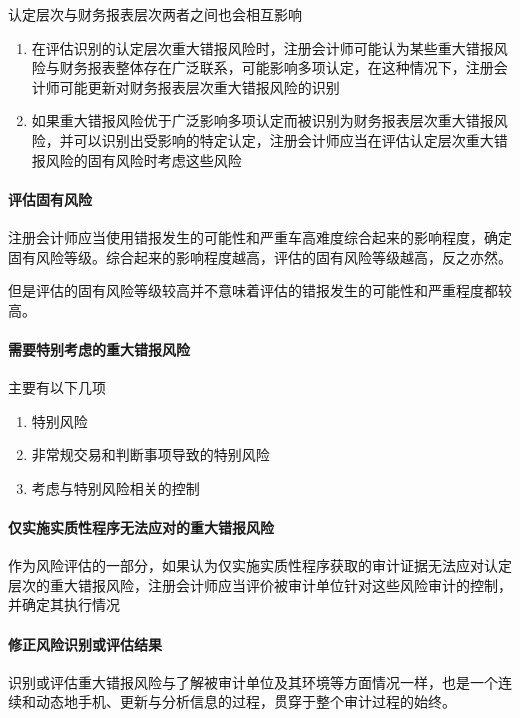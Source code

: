 \documentclass[UTF8,12pt]{ctexart}
\numberwithin{equation}{section} %
\numberwithin{figure}{section}
\numberwithin{table}{section}
\begin{document}
	认定层次与财务报表层次两者之间也会相互影响
	\begin{enumerate}
		\item 在评估识别的认定层次重大错报风险时，注册会计师可能认为某些重大错报风险与财务报表整体存在广泛联系，可能影响多项认定，在这种情况下，注册会计师可能更新对财务报表层次重大错报风险的识别
		
		\item 如果重大错报风险优于广泛影响多项认定而被识别为财务报表层次重大错报风险，并可以识别出受影响的特定认定，注册会计师应当在评估认定层次重大错报风险的固有风险时考虑这些风险
	\end{enumerate}
	
	\paragraph{评估固有风险}
	注册会计师应当使用错报发生的可能性和严重车高难度综合起来的影响程度，确定固有风险等级。综合起来的影响程度越高，评估的固有风险等级越高，反之亦然。
	
	但是评估的固有风险等级较高并不意味着评估的错报发生的可能性和严重程度都较高。
	
	\paragraph{需要特别考虑的重大错报风险}
	主要有以下几项
	\begin{enumerate}
		\item 特别风险
		
		\item 非常规交易和判断事项导致的特别风险
		
		\item 考虑与特别风险相关的控制
	\end{enumerate}
	
	
	
	\paragraph{仅实施实质性程序无法应对的重大错报风险}
	作为风险评估的一部分，如果认为仅实施实质性程序获取的审计证据无法应对认定层次的重大错报风险，注册会计师应当评价被审计单位针对这些风险审计的控制，并确定其执行情况
	
	\paragraph{修正风险识别或评估结果}
	识别或评估重大错报风险与了解被审计单位及其环境等方面情况一样，也是一个连续和动态地手机、更新与分析信息的过程，贯穿于整个审计过程的始终。
	
\end{document}
